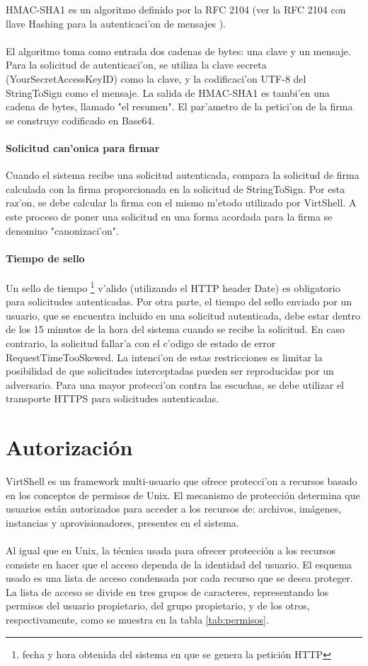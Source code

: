 HMAC-SHA1 es un algoritmo definido por la RFC 2104 (ver la RFC 2104 con llave Hashing para la autenticaci'on de mensajes \cite{rfc2104}).\\
\\
El algoritmo toma como entrada dos cadenas de bytes: una clave y un mensaje. Para la solicitud de autenticaci'on, se utiliza la clave secreta (YourSecretAccessKeyID) como la clave, y la codificaci'on UTF-8 del StringToSign como el mensaje. La salida de HMAC-SHA1 es tambi'en una cadena de bytes, llamado "el resumen". El par'ametro de la petici'on de la firma se construye codificado en Base64.

\paragraph{Solicitud can'onica para firmar}

Cuando el sistema recibe una solicitud autenticada, compara la solicitud de firma calculada con la firma proporcionada en la solicitud de StringToSign. Por esta raz'on, se debe calcular la firma con el mismo m'etodo utilizado por VirtShell. A este proceso de poner una solicitud en una forma acordada para la firma se denomino "canonizaci'on".

\paragraph{Tiempo de sello}

Un sello de tiempo \footnote{fecha y hora obtenida del sistema en que se genera la petición HTTP} v'alido (utilizando el HTTP header Date) es obligatorio para solicitudes autenticadas. Por otra parte, el tiempo del sello enviado por un usuario, que se encuentra incluido en una solicitud autenticada, debe estar dentro de los 15 minutos de la hora del sistema cuando se recibe la solicitud. En caso contrario, la solicitud fallar'a con el c'odigo de estado de error RequestTimeTooSkewed. La intenci'on de estas restricciones es limitar la posibilidad de que solicitudes interceptadas pueden ser reproducidas por un adversario. Para una mayor protecci'on contra las escuchas, se debe utilizar el transporte HTTPS para solicitudes autenticadas.


\section{Autorización}
VirtShell es un framework multi-usuario que ofrece protecci'on a recursos basado en los conceptos de permisos de Unix. El mecanismo de protección determina que usuarios están autorizados para acceder a los recursos de: archivos, imágenes, instancias y aprovisionadores, presentes en el sistema. \\
\\
Al igual que en Unix, la técnica usada para ofrecer protección a los recursos consiste en hacer que el acceso dependa de la identidad del usuario. El esquema usado es una lista de acceso condensada por cada recurso que se desea proteger. La lista de acceso se divide en tres grupos de caracteres, representando los permisos del usuario propietario, del grupo propietario, y de los otros, respectivamente, como se muestra en la tabla \ref{tab:permisos}.

